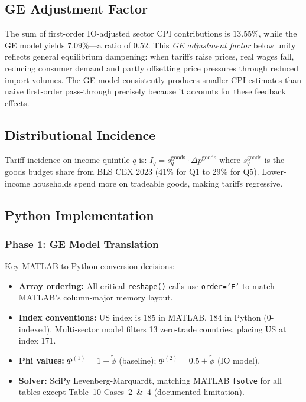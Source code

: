 \documentclass[12pt]{article}
\begin{document}
\subsection{GE Adjustment Factor}

The sum of first-order IO-adjusted sector CPI contributions is $13.55\%$,
while the GE model yields $7.09\%$---a ratio of $0.52$. This \emph{GE
adjustment factor} below unity reflects general equilibrium dampening: when
tariffs raise prices, real wages fall, reducing consumer demand and partly
offsetting price pressures through reduced import volumes. The GE model
consistently produces smaller CPI estimates than naive first-order
pass-through precisely because it accounts for these feedback effects.

\subsection{Distributional Incidence}

Tariff incidence on income quintile $q$ is:
$I_q = s_q^{\text{goods}} \cdot \Delta p^{\text{goods}}$
where $s_q^{\text{goods}}$ is the goods budget share from BLS CEX 2023
(41\% for Q1 to 29\% for Q5). Lower-income households spend more on
tradeable goods, making tariffs regressive.

\subsection{Python Implementation}

\subsubsection{Phase 1: GE Model Translation}

Key MATLAB-to-Python conversion decisions:
\begin{itemize}
    \item \textbf{Array ordering:} All critical \texttt{reshape()} calls
    use \texttt{order='F'} to match MATLAB's column-major memory layout.
    \item \textbf{Index conventions:} US index is 185 in MATLAB, 184 in Python
    (0-indexed). Multi-sector model filters 13 zero-trade countries, placing
    US at index 171.
    \item \textbf{Phi values:} $\Phi^{(1)} = 1 + \tilde{\phi}$ (baseline);
    $\Phi^{(2)} = 0.5 + \tilde{\phi}$ (IO model).
    \item \textbf{Solver:} SciPy Levenberg-Marquardt, matching MATLAB \texttt{fsolve}
    for all tables except Table~10 Cases~2~\&~4 (documented limitation).
\end{itemize}
\end{document}
